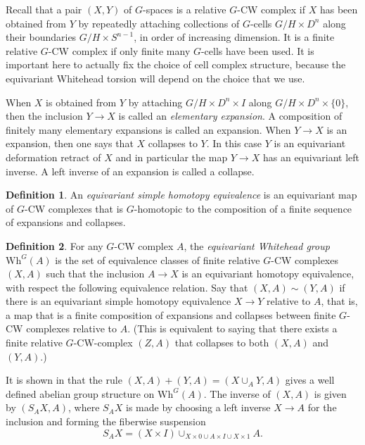 \documentclass[11pt]{amsart}
\theoremstyle{definition}
\newtheorem{defn}{Definition}[section]
\numberwithin{equation}{section}
\numberwithin{figure}{section}
\newcommand{\Wh}{\mathrm{Wh}}
\begin{document}
Recall that a pair $(X,Y)$ of $G$-spaces is a relative $G$-CW complex if $X$ has been obtained from $Y$ by repeatedly attaching collections of $G$-cells $G/H\times D^n$ along their boundaries $G/H\times S^{n-1}$, in order of increasing dimension. It is a finite relative $G$-CW complex if only finite many $G$-cells have been used. It is important here to actually fix the choice of cell complex structure, because the equivariant Whitehead torsion will depend on the choice that we use.

When $X$ is obtained from $Y$ by attaching $G/H \times D^n\times I $ along $G/H \times D^n \times \{0\}$, then the inclusion $Y\to X$ is called an  \emph{elementary expansion}.  A composition of finitely many elementary expansions is called an expansion. When $Y\to X$ is an expansion, then one says that $X$ collapses to $Y$. In this case $Y$ is an equivariant deformation retract of $X$ and in particular the map $Y\to X$ has an equivariant left inverse. A left inverse of an expansion is called a collapse. 
\begin{defn}
An \emph{equivariant simple homotopy equivalence} is an equivariant map of $G$-CW complexes that is $G$-homotopic to the composition of a finite sequence of expansions and collapses.
\end{defn}

\begin{defn}
	For any $G$-CW complex $A$, the \emph{equivariant Whitehead group} $\Wh^G(A)$ is the set of equivalence classes of finite relative $G$-CW complexes $(X, A)$ such that the inclusion $A \to X$ is an equivariant homotopy equivalence, with respect the following equivalence relation. Say that $(X,A) \sim (Y,A)$ if there is an equivariant simple homotopy equivalence $X \to Y$ relative to $A$, that is, a map that is a finite composition of expansions and collapses between finite $G$-CW complexes relative to $A$. (This is equivalent to saying that there exists a finite relative $G$-CW-complex $(Z,A)$ that collapses to both $(X,A)$ and $(Y,A)$.)
\end{defn}

It is shown in \cite[\S 4]{luck} that the rule $(X,A)+(Y,A)=(X\cup_A Y, A)$ gives a well defined abelian group structure on $\Wh^G(A)$. The inverse of $(X,A)$ is given by $(S_AX,A)$, where $S_AX$ is made by choosing a left inverse $X \to A$ for the inclusion and forming the fiberwise suspension 
$$
S_A X = (X \times I) \cup_{X \times 0\cup A \times I\cup X \times 1} A.
$$
\end{document}
